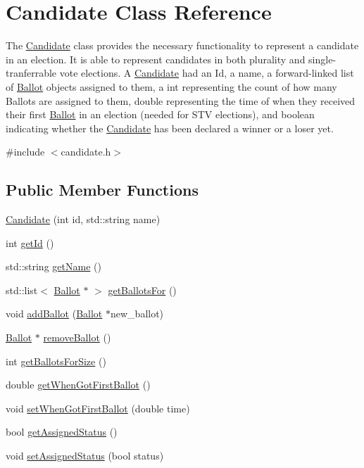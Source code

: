 \hypertarget{classCandidate}{}\section{Candidate Class Reference}
\label{classCandidate}


The \hyperlink{classCandidate}{Candidate} class provides the necessary functionality to represent a candidate in an election. It is able to represent candidates in both plurality and single-\/tranferrable vote elections. A \hyperlink{classCandidate}{Candidate} had an Id, a name, a forward-\/linked list of \hyperlink{classBallot}{Ballot} objects assigned to them, a int representing the count of how many Ballots are assigned to them, double representing the time of when they received their first \hyperlink{classBallot}{Ballot} in an election (needed for S\+TV elections), and boolean indicating whether the \hyperlink{classCandidate}{Candidate} has been declared a winner or a loser yet.  




{\ttfamily \#include $<$candidate.\+h$>$}

\subsection*{Public Member Functions}
\begin{DoxyCompactItemize}
\item 
\hyperlink{classCandidate_a58b3815b3b93c161c47165e3725b704a}{Candidate} (int id, std\+::string name)
\item 
int \hyperlink{classCandidate_a50e7cd31dc68665860932987ad2ffea6}{get\+Id} ()
\item 
std\+::string \hyperlink{classCandidate_af862d92e21d66d74f1d5cae92937d3da}{get\+Name} ()
\item 
std\+::list$<$ \hyperlink{classBallot}{Ballot} $\ast$ $>$ \hyperlink{classCandidate_a2bd33d32107aa062ef8bd82e8b2ee7e9}{get\+Ballots\+For} ()
\item 
void \hyperlink{classCandidate_abbe882aa5bad2f1b769c3df933495703}{add\+Ballot} (\hyperlink{classBallot}{Ballot} $\ast$new\+\_\+ballot)
\item 
\hyperlink{classBallot}{Ballot} $\ast$ \hyperlink{classCandidate_a329eae2002b3584594dd10c92b5f6f51}{remove\+Ballot} ()
\item 
int \hyperlink{classCandidate_abe5eb062e31ef3602b4434e5e9f1e596}{get\+Ballots\+For\+Size} ()
\item 
double \hyperlink{classCandidate_acb99e3ce6e39413c36b1181f67b870ff}{get\+When\+Got\+First\+Ballot} ()
\item 
void \hyperlink{classCandidate_a97be1d696ea97201ec69a75bf708d9f2}{set\+When\+Got\+First\+Ballot} (double time)
\item 
bool \hyperlink{classCandidate_ac00fcb7914f89cca8bb02ed2e6d6f4e4}{get\+Assigned\+Status} ()
\item 
void \hyperlink{classCandidate_a9b407c109b00124423fbe4a722a503c2}{set\+Assigned\+Status} (bool status)
\end{DoxyCompactItemize}


